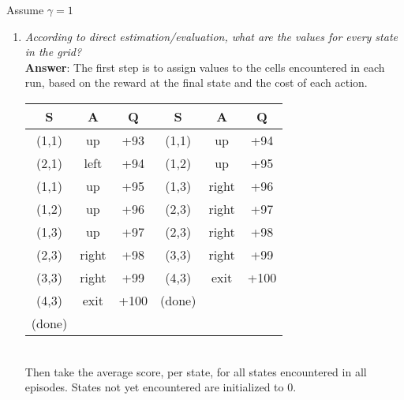 \documentclass[fleqn]{hw5}
\begin{document}
Assume $\gamma = 1 $
\begin{enumerate}
\item \textit{According to direct estimation/evaluation, what are the values for every state
in the grid?}\\
\textbf{Answer}: The first step is to assign values to the cells encountered in each run, based on the reward at the final state
and the cost of each action. \\
\begin{tabular}{ccc|ccc}
	{\bf S} & {\bf A} & {\bf Q} & {\bf S} & {\bf A} & {\bf Q} \\
	\hline
	(1,1) & up    & +93    & (1,1) & up    & +94\\
	(2,1) & left  & +94    & (1,2) & up    & +95\\
	(1,1) & up    & +95    & (1,3) & right & +96\\
	(1,2) & up    & +96    & (2,3) & right & +97\\
	(1,3) & up    & +97    & (2,3) & right & +98\\
	(2,3) & right & +98    & (3,3) & right & +99\\
	(3,3) & right & +99    & (4,3) & exit  & +100 \\
	(4,3) & exit  & +100   & (done)&       & \\
	(done)&       &        &       &       & \\
\end{tabular}\\

Then take the average score, per state, for all states encountered in all episodes. States not yet encountered are initialized
to $0$.\\
\newcommand\B{\rule[-2ex]{0pt}{0pt}} %
\begin{figure}[h] %

{\renewcommand{\arraystretch}{1.9}
\begin{tabular}{c|c|c|c|c|}
\hline


\end{tabular}}
\end{figure}
\end{enumerate}
\end{document}
